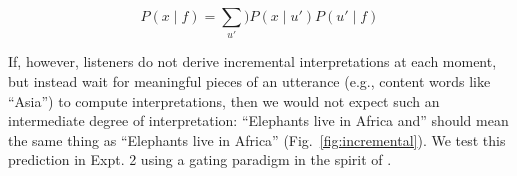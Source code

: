 \documentclass[10pt,letterpaper]{article}
\begin{document}
\begin{equation}
P(x \mid f) = \sum_{u'}) P(x \mid u') P(u' \mid f) 
\label{eq:L0a}
\end{equation}

If, however, listeners do not derive incremental interpretations at each moment, but instead wait for meaningful pieces of an utterance (e.g., content words like ``Asia'') to compute interpretations, then we would not expect such an intermediate degree of interpretation: ``Elephants live in Africa and'' should mean the same thing as ``Elephants live in Africa'' (Fig.~\ref{fig:incremental}). 
We test this prediction in Expt. 2 using a gating paradigm in the spirit of .


\end{document}
